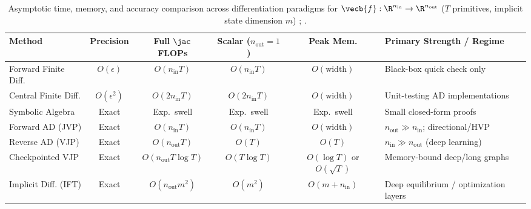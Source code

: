 \documentclass[../../../../master.tex]{subfiles}
\begin{document}
\begin{table}[htbp]
\centering
\footnotesize
\setlength{\tabcolsep}{4pt}
\begin{tabularx}{\textwidth}{@{}>{\raggedright\arraybackslash}p{2.65cm}cccc>{\raggedright\arraybackslash}X@{}}
\toprule
\textbf{Method} & \textbf{Precision} & \textbf{Full $\jac$ FLOPs} & \textbf{Scalar ($n_{\text{out}}\!=\!1$)} & \textbf{Peak Mem.} & \textbf{Primary Strength / Regime} \\
\midrule
Forward Finite Diff. & $O(\epsilon)$ & $O(n_{\text{in}} T)$ & $O(n_{\text{in}} T)$ & $O(\text{width})$ & Black-box quick check only \\
Central Finite Diff. & $O(\epsilon^2)$ & $O(2 n_{\text{in}} T)$ & $O(2 n_{\text{in}} T)$ & $O(\text{width})$ & Unit-testing AD implementations \\
Symbolic Algebra & Exact & Exp.\ swell & Exp.\ swell & Exp.\ swell & Small closed-form proofs \\
Forward AD (JVP) & Exact & $O(n_{\text{in}} T)$ & $O(n_{\text{in}} T)$ & $O(\text{width})$ & $n_{\text{out}} \gg n_{\text{in}}$; directional/HVP \\
Reverse AD (VJP) & Exact & $O(n_{\text{out}} T)$ & $O(T)$ & $O(T)$ & $n_{\text{in}} \gg n_{\text{out}}$ (deep learning) \\
Checkpointed VJP & Exact & $O(n_{\text{out}} T \log T)$ & $O(T \log T)$ & $O(\log T)$ or $O(\sqrt{T})$ & Memory-bound deep/long graphs \\
Implicit Diff. (IFT) & Exact & $O(n_{\text{out}} m^2)$ & $O(m^2)$ & $O(m+n_{\text{in}})$ & Deep equilibrium / optimization layers \\
\bottomrule
\end{tabularx}
\caption{Asymptotic time, memory, and accuracy comparison across differentiation paradigms for $\vecb{f} : \R^{n_{\text{in}}} \to \R^{n_{\text{out}}}$ ($T$ primitives, implicit state dimension $m$) ; .}
\label{tab:matcalc:complexity}
\end{table}
\end{document}
